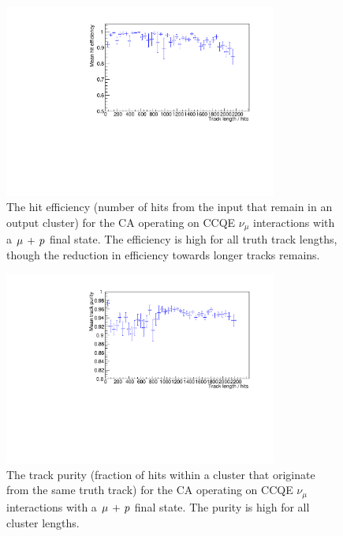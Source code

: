 \begin{figure}
    \centering
    \includegraphics[angle=-90,width=0.8\textwidth]{chapters/cellularautomaton_images/ccqe-efficiency}
    \caption[Hit efficiency for CCQE events reconstructed with a CA]{\label{fig:ca-ccqe-full-efficiency}The hit efficiency (number of hits from the input that remain in an output cluster) for the CA operating on CCQE $\nu_\mu$ interactions with a $\mu\,+\,p$ final state. The efficiency is high for all truth track lengths, though the reduction in efficiency towards longer tracks remains.}
\end{figure}

\begin{figure}
    \centering
    \includegraphics[angle=-90,width=0.8\textwidth]{chapters/cellularautomaton_images/ccqe-purity}
    \caption[Track purity for CCQE events reconstructed with a CA]{\label{fig:ca-ccqe-full-purity}The track purity (fraction of hits within a cluster that originate from the same truth track) for the CA operating on CCQE $\nu_\mu$ interactions with a $\mu\,+\,p$ final state. The purity is high for all cluster lengths.}
\end{figure}

